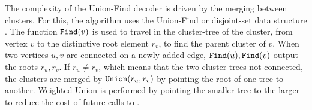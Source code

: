 The complexity of the Union-Find decoder is driven by the merging between clusters. For this, the algorithm uses the Union-Find or disjoint-set data structure \cite{tarjan1975efficiency}. The function $\texttt{Find}(v)$ is used to travel in the cluster-tree of the cluster, from vertex $v$ to the distinctive root element $r_v$, to find the parent cluster of $v$. When two vertices $u, v$ are connected on a newly added edge, $\texttt{Find}(u), \texttt{Find}(v)$ output the roots $r_u, r_v$. If $r_u \neq r_v$, which means that the two cluster-trees not connected, the clusters are merged by $\texttt{Union}(r_u, r_v)$ by pointing the root of one tree to another. Weighted Union is performed by pointing the smaller tree to the larger to reduce the cost of future calls to .